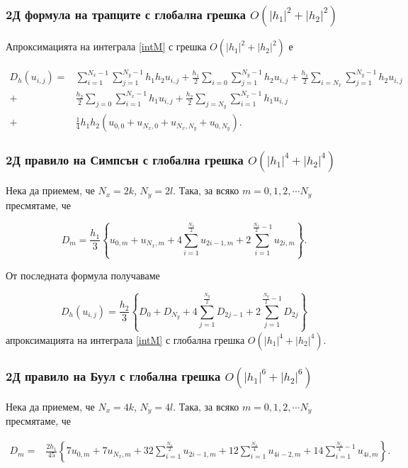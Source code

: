 \documentclass{article}
\theoremstyle{remark}
\begin{document}
\subsubsection{ 2Д формула на трапците с глобална грешка $O(|h_1|^2+|h_2|^2)$ }

Апроксимацията на интеграла \eqref{intM} с грешка $O(|h_1|^2+|h_2|^2)$ е

\begin{align}\label{quadr2}
D_h(u_{i,j}) =& \sum_{i=1}^{N_x-1} \sum_{j=1}^{N_y-1} h_1 h_2 u_{i,j}
+\frac{h_1}{2}\sum_{i=0} \sum_{j=1}^{N_y-1} h_2 u_{i,j}
+\frac{h_1}{2}\sum_{i=N_x} \sum_{j=1}^{N_y-1} h_2 u_{i,j} \nonumber\\
+&\frac{h_2}{2}\sum_{j=0} \sum_{i=1}^{N_x-1} h_1 u_{i,j}
+\frac{h_2}{2}\sum_{j=N_y} \sum_{i=1}^{N_x-1} h_1 u_{i,j}
\nonumber\\
+&\frac{1}{4}h_1 h_2 \left(u_{0,0}+u_{N_x,0}+u_{N_x,N_y}+u_{0,N_y}
\right).
\end{align}

\subsubsection{ 2Д правило на Симпсън с глобална грешка $O(|h_1|^4+|h_2|^4)$}

Нека да приемем, че $N_x=2k$, $N_y=2 l$. Така, за всяко $m=0,1,2,\cdots N_y$ пресмятаме, че

$$D_m= \frac{h_1 }{3} 
\left\{ u_{0,m}+u_{N_x,m}+ 4 \sum_{i=1}^{\frac{N_x}{2}}   u_{2i-1,m}
 +2 \sum_{i=1}^{\frac{N_x}{2}-1} u_{2i,m} \right\}.$$


От последната формула получаваме

\begin{equation}\label{quadr4}
D_h(u_{i,j}) =\frac{h_2 }{3} 
\left\{ D_{0}+D_{N_y}+ 4 \sum_{j=1}^{\frac{N_y}{2}}   D_{2j-1}
 +2 \sum_{j=1}^{{\frac{N_y}{2}}-1} D_{2j} \right\}
\end{equation}
апроксимацията на интеграла \eqref{intM} с глобална грешка $O(|h_1|^4+|h_2|^4)$.


\subsubsection{ 2Д правило на Буул с глобална грешка $O(|h_1|^6+|h_2|^6)$}

Нека да приемем, че $N_x=4k$, $N_y=4 l$. Така, за всяко $m=0,1,2,\cdots N_y$ пресмятаме, че

\begin{align*}
D_m =& \frac{2h_1}{45} 
\left\{
7u_{0,m}+7u_{N_x,m}+32 \sum_{i=1}^{\frac{N_x}{2}}u_{2i-1,m}
+12\sum_{i=1}^{\frac{N_x}{4}}u_{4i-2,m}
+14 \sum_{i=1}^{\frac{N_x}{4}-1}u_{4i,m}
\right\}.
\end{align*}
\end{document}
